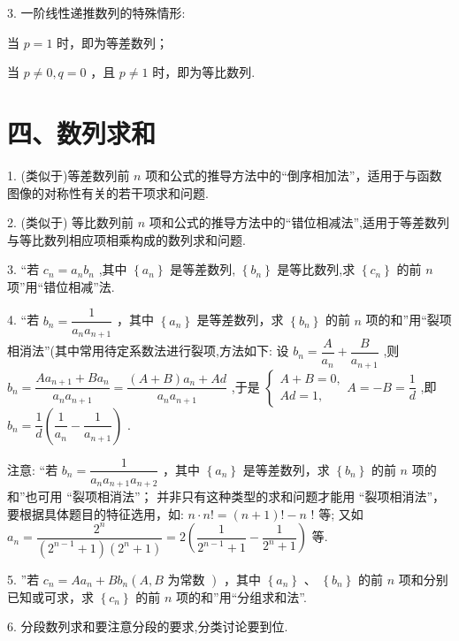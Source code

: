 3. 一阶线性递推数列的特殊情形:

  当 $p = 1$ 时，即为等差数列；

  当 $p \neq  0,q = 0$ ，且 $p \neq  1$ 时，即为等比数列.

\section*{四、数列求和}

1. (类似于)等差数列前 $n$ 项和公式的推导方法中的“倒序相加法”，适用于与函数图像的对称性有关的若干项求和问题.

2. (类似于) 等比数列前 $n$ 项和公式的推导方法中的“错位相减法”,适用于等差数列与等比数列相应项相乘构成的数列求和问题.

3. “若 ${c}_{n} = {a}_{n}{b}_{n}$ ,其中 $\left\{  {a}_{n}\right\}$ 是等差数列, $\left\{  {b}_{n}\right\}$ 是等比数列,求 $\left\{  {c}_{n}\right\}$ 的前 $n$ 项”用“错位相减”法.

4. “若 ${b}_{n} = \dfrac{1}{{a}_{n}{a}_{n + 1}}$ ，其中 $\left\{  {a}_{n}\right\}$ 是等差数列，求 $\left\{  {b}_{n}\right\}$ 的前 $n$ 项的和”用“裂项相消法”(其中常用待定系数法进行裂项,方法如下: 设 ${b}_{n} = \dfrac{A}{{a}_{n}} + \dfrac{B}{{a}_{n + 1}}$ ,则 ${b}_{n} = \dfrac{A{a}_{n + 1} + B{a}_{n}}{{a}_{n}{a}_{n + 1}} = \dfrac{\left( {A + B}\right) {a}_{n} + {Ad}}{{a}_{n}{a}_{n + 1}}$ ,于是 $\left\{  {\begin{array}{l} A + B = 0, \\  {Ad} = 1, \end{array}A =  - B = }\right.  \dfrac{1}{d}$ ,即 ${b}_{n} = \dfrac{1}{d}\left( {\dfrac{1}{{a}_{n}} - \dfrac{1}{{a}_{n + 1}}}\right)$ .

注意:   “若 ${b}_{n} = \dfrac{1}{{a}_{n}{a}_{n + 1}{a}_{n + 2}}$ ，其中 $\left\{  {a}_{n}\right\}$ 是等差数列，求 $\left\{  {b}_{n}\right\}$ 的前 $n$ 项的和”也可用 “裂项相消法”；    并非只有这种类型的求和问题才能用 “裂项相消法”，要根据具体题目的特征选用，如: $n \cdot  n! = \left( {n + 1}\right) !  - n$ ! 等; 又如 ${a}_{n} = \dfrac{{2}^{n}}{\left( {{2}^{n - 1} + 1}\right) \left( {{2}^{n} + 1}\right) } = 2\left( {\dfrac{1}{{2}^{n - 1} + 1} - \dfrac{1}{{2}^{n} + 1}}\right)$ 等.

5. ”若 ${c}_{n} = A{a}_{n} + B{b}_{n}\left( {A,B\text{ 为常数 }}\right)$ ，其中 $\left\{  {a}_{n}\right\}$ 、 $\left\{  {b}_{n}\right\}$ 的前 $n$ 项和分别已知或可求，求 $\left\{  {c}_{n}\right\}$ 的前 $n$ 项的和”用“分组求和法”.

6. 分段数列求和要注意分段的要求,分类讨论要到位.

